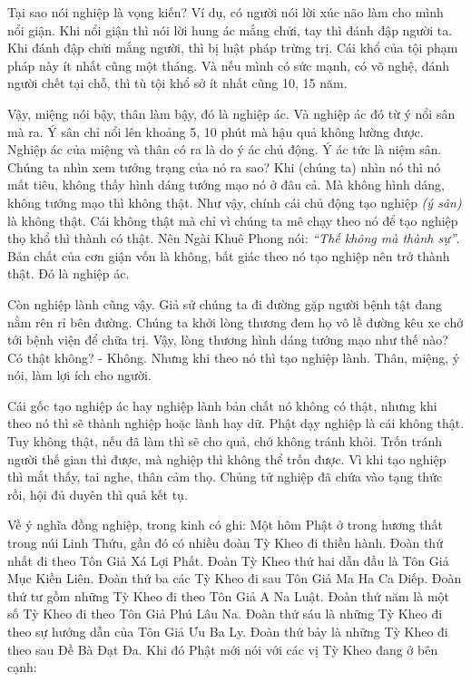 \documentclass[
  12pt,
  oneside]{book}
\begin{document}
Tại sao nói nghiệp là vọng kiến? Ví dụ, có người nói lời xúc não làm cho mình nổi giận. Khi nổi giận thì nói lời hung ác mắng chửi, tay thì đánh đập người ta. Khi đánh đập chửi mắng người, thì bị luật pháp trừng trị. Cái khổ của tội phạm pháp này ít nhất cũng một tháng. Và nếu mình có sức mạnh, có võ nghệ, đánh người chết tại chỗ, thì tù tội khổ sở ít nhất cũng 10, 15 năm.

Vậy, miệng nói bậy, thân làm bậy, đó là nghiệp ác. Và nghiệp ác đó từ ý nổi sân mà ra. Ý sân chỉ nổi lên khoảng 5, 10 phút mà hậu quả không lường được. Nghiệp ác của miệng và thân có ra là do ý ác chủ động. Ý ác tức là niệm sân. Chúng ta nhìn xem tướng trạng của nó ra sao? Khi (chúng ta) nhìn nó thì nó mất tiêu, không thấy hình dáng tướng mạo nó ở đâu cả. Mà không hình dáng, không tướng mạo thì không thật. Như vậy, chính cái chủ động tạo nghiệp \emph{(ý sân)} là không thật. Cái không thật mà chỉ vì chúng ta mê chạy theo nó để tạo nghiệp thọ khổ thì thành có thật. Nên Ngài Khuê Phong nói: \emph{``Thế không mà thành sự''}. Bản chất của cơn giận vốn là không, bất giác theo nó tạo nghiệp nên trở thành thật. Đó là nghiệp ác.

Còn nghiệp lành cũng vậy. Giả sử chúng ta đi đường gặp người bệnh tật đang nằm rên rỉ bên đường. Chúng ta khởi lòng thương đem họ vô lề đường kêu xe chở tới bệnh viện để chữa trị. Vậy, lòng thương hình dáng tướng mạo như thế nào? Có thật không? - Không. Nhưng khi theo nó thì tạo nghiệp lành. Thân, miệng, ý nói, làm lợi ích cho người.

Cái gốc tạo nghiệp ác hay nghiệp lành bản chất nó không có thật, nhưng khi theo nó thì sẽ thành nghiệp hoặc lành hay dữ. Phật dạy nghiệp là cái không thật. Tuy không thật, nếu đã làm thì sẽ cho quả, chớ không tránh khỏi. Trốn tránh người thế gian thì được, mà nghiệp thì không thể trốn được. Vì khi tạo nghiệp thì mắt thấy, tai nghe, thân cảm thọ. Chủng tử nghiệp đã chứa vào tạng thức rồi, hội đủ duyên thì quả kết tụ.

Về ý nghĩa đồng nghiệp, trong kinh có ghi: Một hôm Phật ở trong hương thất trong núi Linh Thứu, gần đó có nhiều đoàn Tỳ Kheo đi thiền hành. Đoàn thứ nhất đi theo Tôn Giả Xá Lợi Phất. Đoàn Tỳ Kheo thứ hai dẫn đầu là Tôn Giả Mục Kiền Liên. Đoàn thứ ba các Tỳ Kheo đi sau Tôn Giả Ma Ha Ca Diếp. Đoàn thứ tư gồm những Tỳ Kheo đi theo Tôn Giả A Na Luật. Đoàn thứ năm là một số Tỳ Kheo đi theo Tôn Giả Phú Lâu Na. Đoàn thứ sáu là những Tỳ Kheo đi theo sự hướng dẫn của Tôn Giả Ưu Ba Ly. Đoàn thứ bảy là những Tỳ Kheo đi theo sau Đề Bà Đạt Đa. Khi đó Phật mới nói với các vị Tỳ Kheo đang ở bên cạnh:
\end{document}
